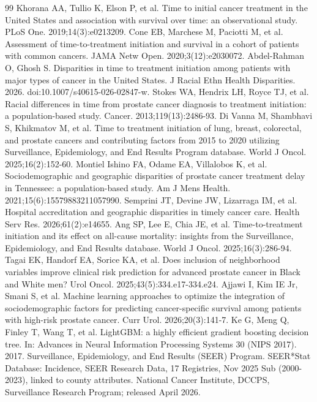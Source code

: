 \documentclass[10pt,a4paper,twocolumn]{article}
\begin{document}
\begin{thebibliography}{99}
 Khorana AA, Tullio K, Elson P, et al. Time to initial cancer treatment in the United States and association with survival over time: an observational study. PLoS One. 2019;14(3):e0213209.
 Cone EB, Marchese M, Paciotti M, et al. Assessment of time-to-treatment initiation and survival in a cohort of patients with common cancers. JAMA Netw Open. 2020;3(12):e2030072.
 Abdel-Rahman O, Ghosh S. Disparities in time to treatment initiation among patients with major types of cancer in the United States. J Racial Ethn Health Disparities. 2026. doi:10.1007/s40615-026-02847-w.
 Stokes WA, Hendrix LH, Royce TJ, et al. Racial differences in time from prostate cancer diagnosis to treatment initiation: a population-based study. Cancer. 2013;119(13):2486-93.
 Di Vanna M, Shambhavi S, Khikmatov M, et al. Time to treatment initiation of lung, breast, colorectal, and prostate cancers and contributing factors from 2015 to 2020 utilizing Surveillance, Epidemiology, and End Results Program database. World J Oncol. 2025;16(2):152-60.
 Montiel Ishino FA, Odame EA, Villalobos K, et al. Sociodemographic and geographic disparities of prostate cancer treatment delay in Tennessee: a population-based study. Am J Mens Health. 2021;15(6):15579883211057990.
 Semprini JT, Devine JW, Lizarraga IM, et al. Hospital accreditation and geographic disparities in timely cancer care. Health Serv Res. 2026;61(2):e14655.
 Ang SP, Lee E, Chia JE, et al. Time-to-treatment initiation and its effect on all-cause mortality: insights from the Surveillance, Epidemiology, and End Results database. World J Oncol. 2025;16(3):286-94.
 Tagai EK, Handorf EA, Sorice KA, et al. Does inclusion of neighborhood variables improve clinical risk prediction for advanced prostate cancer in Black and White men? Urol Oncol. 2025;43(5):334.e17-334.e24.
 Ajjawi I, Kim IE Jr, Smani S, et al. Machine learning approaches to optimize the integration of sociodemographic factors for predicting cancer-specific survival among patients with high-risk prostate cancer. Curr Urol. 2026;20(3):141-7.
 Ke G, Meng Q, Finley T, Wang T, et al. LightGBM: a highly efficient gradient boosting decision tree. In: Advances in Neural Information Processing Systems 30 (NIPS 2017). 2017.
 Surveillance, Epidemiology, and End Results (SEER) Program. SEER*Stat Database: Incidence, SEER Research Data, 17 Registries, Nov 2025 Sub (2000-2023), linked to county attributes. National Cancer Institute, DCCPS, Surveillance Research Program; released April 2026.

\end{thebibliography}
\end{document}
